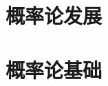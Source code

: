 \documentclass{ctexart}
\begin{document}
\tableofcontents
\newpage

\section{概率论发展}


\section{概率论基础}
\end{document}
